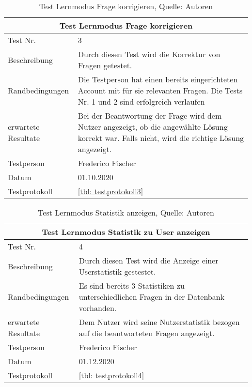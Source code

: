 \begin{table}[H]
\begin{tabularx}{\textwidth}{lX}
  \hline
  \multicolumn{2}{|c|}{Test Lernmodus Frage korrigieren} \\
  \hline
  Test Nr. & 3\\
  Beschreibung & Durch diesen Test wird die Korrektur von Fragen getestet.\\
  Randbedingungen & Die Testperson hat einen bereits eingerichteten Account mit für sie relevanten Fragen. Die Tests Nr. 1 und 2 sind erfolgreich verlaufen\\
  erwartete Resultate & Bei der Beantwortung der Frage wird dem Nutzer angezeigt, ob die angewählte Lösung korrekt war. Falls nicht, wird die richtige Lösung angezeigt.  \\
  Testperson & Frederico Fischer \\
  Datum & 01.10.2020 \\
  Testprotokoll & \ref{tbl: testprotokoll3}\\
   \hline
\end{tabularx}
\caption{ \label{tbl: Test Lernmodus Frage korrigieren}Test Lernmodus Frage korrigieren, Quelle: Autoren}
\end{table}

\begin{table}[H]
\begin{tabularx}{\textwidth}{lX}
  \hline
  \multicolumn{2}{|c|}{Test Lernmodus Statistik zu User anzeigen} \\
  \hline
  Test Nr. & 4\\
  Beschreibung & Durch diesen Test wird die Anzeige einer Userstatistik gestestet.\\
  Randbedingungen & Es sind bereits 3 Statistiken zu unterschiedlichen Fragen in der Datenbank vorhanden. \\
  erwartete Resultate & Dem Nutzer wird seine Nutzerstatistik bezogen auf die beantworteten Fragen angezeigt.  \\
  Testperson & Frederico Fischer \\
  Datum & 01.12.2020 \\
  Testprotokoll & \ref{tbl: testprotokoll4}\\
   \hline
\end{tabularx}
\caption{ \label{tbl: Test Lernmodus Statistik anzeigen}Test Lernmodus Statistik anzeigen, Quelle: Autoren}
\end{table}

